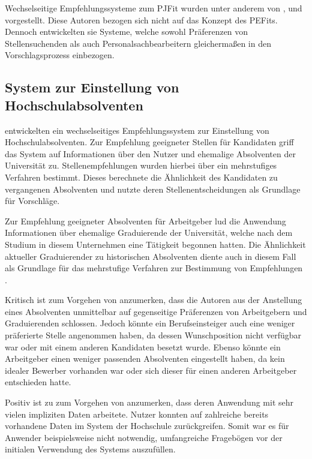 Wechselseitige Empfehlungssysteme zum \ac{PJFit} wurden unter anderem von \textcite[S. 1ff.]{ding:2016}, \textcite[S. 1ff.]{wenxing:2015} und \textcite[S. 1ff.]{lu:2013} vorgestellt. Diese Autoren bezogen sich nicht auf das Konzept des \acp{PEFit}. Dennoch entwickelten sie Systeme, welche sowohl Präferenzen von Stellensuchenden als auch Personalsachbearbeitern gleichermaßen in den Vorschlagsprozess einbezogen. 

\subsection{System zur Einstellung von Hochschulabsolventen}
\label{ch:verwandteArbeiten:nichtAufDemPEFitBasierendeBilateraleSysteme:absolventen}
\textcite[S. 1ff.]{ding:2016} entwickelten ein wechselseitiges Empfehlungssystem zur Einstellung von Hochschulabsolventen. Zur Empfehlung geeigneter Stellen für Kandidaten griff das System auf Informationen über den Nutzer und ehemalige Absolventen der Universität zu. Stellenempfehlungen wurden hierbei über ein mehrstufiges Verfahren bestimmt. Dieses berechnete die Ähnlichkeit des Kandidaten zu vergangenen Absolventen und nutzte deren Stellenentscheidungen als Grundlage für Vorschläge.

Zur Empfehlung geeigneter Absolventen für Arbeitgeber lud die Anwendung Informationen über ehemalige Graduierende der Universität, welche nach dem Studium in diesem Unternehmen eine Tätigkeit begonnen hatten. Die Ähnlichkeit aktueller Graduierender zu historischen Absolventen diente auch in diesem Fall als Grundlage für das mehrstufige Verfahren zur Bestimmung von Empfehlungen \cite[S. 1ff.]{ding:2016}.

Kritisch ist zum Vorgehen von \textcite[S. 1ff.]{ding:2016} anzumerken, dass die Autoren aus der Anstellung eines Absolventen unmittelbar auf gegenseitige Präferenzen von Arbeitgebern und Graduierenden schlossen. Jedoch könnte ein Berufseinsteiger auch eine weniger präferierte Stelle angenommen haben, da dessen Wunschposition nicht verfügbar war oder mit einem anderen Kandidaten besetzt wurde. Ebenso könnte ein Arbeitgeber einen weniger passenden Absolventen eingestellt haben, da kein idealer Bewerber vorhanden war oder sich dieser für einen anderen Arbeitgeber entschieden hatte.

Positiv ist zu zum Vorgehen von \textcite[S. 1ff.]{ding:2016} anzumerken, dass deren Anwendung mit sehr vielen impliziten Daten arbeitete. Nutzer konnten auf zahlreiche bereits vorhandene Daten im System der Hochschule zurückgreifen. Somit war es für Anwender beispielsweise nicht notwendig, umfangreiche Fragebögen vor der initialen Verwendung des Systems auszufüllen.

